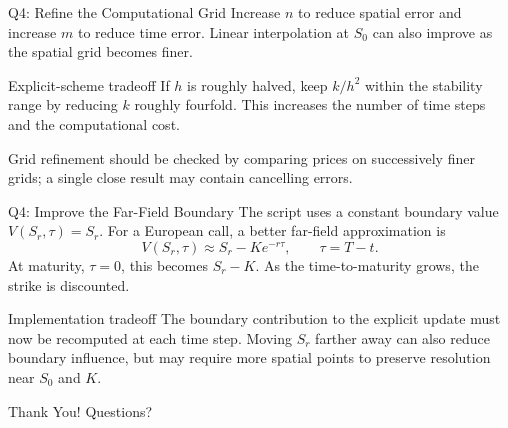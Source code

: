\documentclass{beamer}
\begin{document}
\begin{frame}{Q4: Refine the Computational Grid}
Increase $n$ to reduce spatial error and increase $m$ to reduce
time error. Linear interpolation at $S_0$ can also improve as
the spatial grid becomes finer.

\begin{block}{Explicit-scheme tradeoff}
If $h$ is roughly halved, keep $k/h^2$ within the stability
range by reducing $k$ roughly fourfold. This increases the
number of time steps and the computational cost.
\end{block}

Grid refinement should be checked by comparing prices on
successively finer grids; a single close result may contain
cancelling errors.
\end{frame}

\begin{frame}{Q4: Improve the Far-Field Boundary}
The script uses a constant boundary value $V(S_r,\tau)=S_r$.
For a European call, a better far-field approximation is
\[
\boxed{V(S_r,\tau)\approx S_r-Ke^{-r\tau}},
\qquad \tau=T-t.
\]
At maturity, $\tau=0$, this becomes $S_r-K$.
As the time-to-maturity grows, the strike is discounted.

\begin{block}{Implementation tradeoff}
The boundary contribution to the explicit update must now be
recomputed at each time step. Moving $S_r$ farther away can
also reduce boundary influence, but may require more spatial
points to preserve resolution near $S_0$ and $K$.
\end{block}
\end{frame}


\begin{frame}
\vfill
\begin{center}{\LARGE Thank You! Questions?}\end{center}
\vfill
\end{frame}
\end{document}
